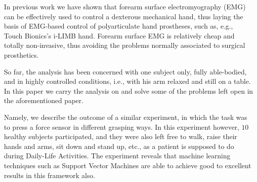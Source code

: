 In previous work \cite{2008.ICRA,2008.BioCyb} we have shown that
forearm surface electromyography (EMG) can be effectively used to
control a dexterous mechanical hand, thus laying the basis of
EMG-based control of polyarticulate hand prostheses, such as, e.g.,
Touch Bionics's i-LIMB hand. Forearm surface EMG is relatively cheap
and totally non-invasive, thus avoiding the problems normally
associated to surgical prosthetics.

So far, the analysis has been concerned with one subject only, fully
able-bodied, and in highly controlled conditions, i.e., with his arm
relaxed and still on a table. In this paper we carry the analysis on
and solve some of the problems left open in the aforementioned
paper.

Namely, we describe the outcome of a similar experiment, in which the
task was to press a force sensor in different grasping ways. In this
experiment however, $10$ healthy subjects participated, and they were
also left free to walk, raise their hands and arms, sit down and stand
up, etc., as a patient is supposed to do during Daily-Life
Activities. The experiment reveals that machine learning techniques
such as Support Vector Machines are able to achieve good to excellent
results in this framework also.
